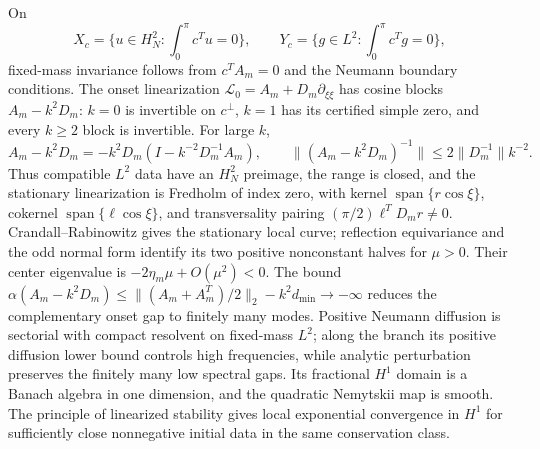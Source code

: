 \documentclass[10pt]{article}
\begin{document}
On
\[
 X_c=\{u\in H_N^2:\textstyle\int_0^\pi c^Tu=0\},\qquad
 Y_c=\{g\in L^2:\textstyle\int_0^\pi c^Tg=0\},
\]
fixed-mass invariance follows from $c^TA_m=0$ and the Neumann boundary
conditions.  The onset linearization
$\mathcal L_0=A_m+D_m\partial_{\xi\xi}$ has cosine blocks
$A_m-k^2D_m$: $k=0$ is invertible on $c^\perp$, $k=1$ has its certified
simple zero, and every $k\ge2$ block is invertible.  For large $k$,
\[
 A_m-k^2D_m=-k^2D_m(I-k^{-2}D_m^{-1}A_m),\qquad
 \|(A_m-k^2D_m)^{-1}\|\le2\|D_m^{-1}\|k^{-2}.
\]
Thus compatible $L^2$ data have an $H_N^2$ preimage, the range is closed, and
the stationary linearization is Fredholm of index zero, with kernel
$\operatorname{span}\{r\cos\xi\}$, cokernel
$\operatorname{span}\{\ell\cos\xi\}$, and transversality pairing
$(\pi/2)\ell^TD_mr\ne0$.  Crandall--Rabinowitz gives the stationary local curve; reflection equivariance
and the odd normal form identify its two positive nonconstant halves for
$\mu>0$. Their center eigenvalue is $-2\eta_m\mu+O(\mu^2)<0$.  The bound
$\alpha(A_m-k^2D_m)\le\|(A_m+A_m^T)/2\|_2-k^2d_{\min}\to-\infty$
reduces the complementary onset gap to finitely many modes.  Positive Neumann
diffusion is sectorial with compact resolvent on fixed-mass $L^2$; along the
branch its positive diffusion lower bound controls high frequencies, while
analytic perturbation preserves the finitely many low spectral gaps.  Its
fractional $H^1$ domain is a Banach algebra in one dimension, and the quadratic
Nemytskii map is smooth.  The principle of linearized stability gives local
exponential convergence in $H^1$ for sufficiently close nonnegative initial
data in the same conservation class.

\newpage
\end{document}
